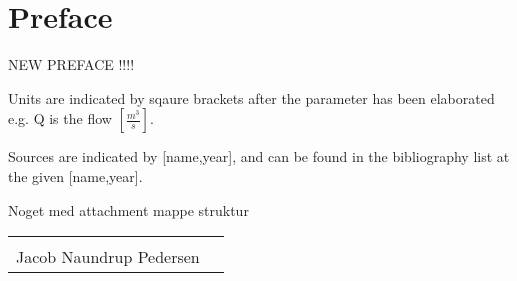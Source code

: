 \chapter*{Preface}
NEW PREFACE !!!!

Units are indicated by sqaure brackets after the parameter has been elaborated e.g. Q is the flow $\left[\frac{m^3}{s}\right]$. 

Sources are indicated by [name,year], and can be found in the bibliography list at the given
[name,year].

Noget med attachment mappe struktur

\vfill

\begin{table}[H]
	\centering
		\begin{tabular}{c c }
			\underline{\phantom{mmmmmmmmmmmmmmmmmmm}}       \\
			Jacob Naundrup Pedersen \\
		\end{tabular}
		
\end{table}

